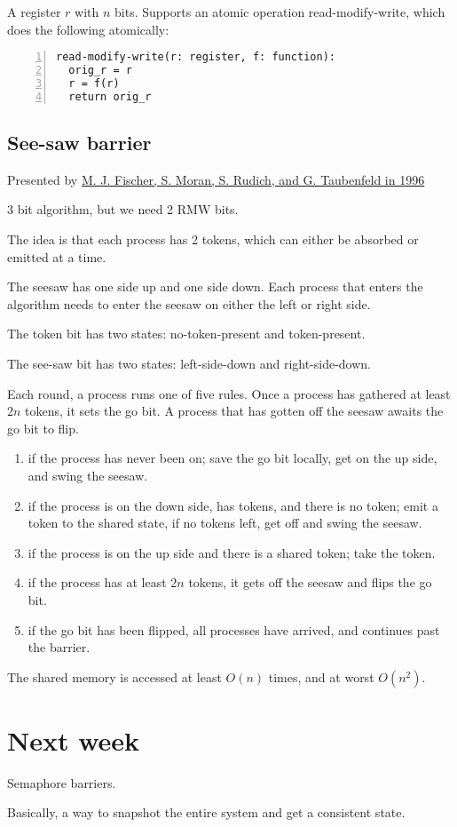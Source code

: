 \documentclass{idc_msc}
\begin{document}
A register $r$ with $n$ bits.
Supports an atomic operation read-modify-write, which does the following atomically:

\begin{lstlisting}[frame=L,mathescape=true,numbers=left]
read-modify-write(r: register, f: function):
  orig_r = r
  r = f(r)
  return orig_r
\end{lstlisting}

\subsection{See-saw barrier}

Presented by \href{https://www.faculty.idc.ac.il/gadi/MyPapers/1996FMRT-wakeup.pdf}{M. J. Fischer, S. Moran, S. Rudich, and G. Taubenfeld in 1996}

3 bit algorithm, but we need 2 RMW bits.

The idea is that each process has 2 tokens, which can either be absorbed or emitted at a time.

The seesaw has one side up and one side down.
Each process that enters the algorithm needs to enter the seesaw on either the left or right side.

The token bit has two states: no-token-present and token-present.

The see-saw bit has two states: left-side-down and right-side-down.

Each round, a process runs one of five rules. Once a process has gathered at least $2n$ tokens, it sets the go bit. A process that has gotten off the seesaw awaits the go bit to flip.

\begin{enumerate}
  \item if the process has never been on; save the go bit locally, get on the up side, and swing the seesaw.
  \item if the process is on the down side, has tokens, and there is no token; emit a token to the shared state, if no tokens left, get off and swing the seesaw.
  \item if the process is on the up side and there is a shared token; take the token.
  \item if the process has at least $2n$ tokens, it gets off the seesaw and flips the go bit.
  \item if the go bit has been flipped, all processes have arrived, and continues past the barrier.
\end{enumerate}

The shared memory is accessed at least $O(n)$ times, and at worst $O(n^2)$.

\section{Next week}

Semaphore barriers.

Basically, a way to snapshot the entire system and get a consistent state.
\end{document}
